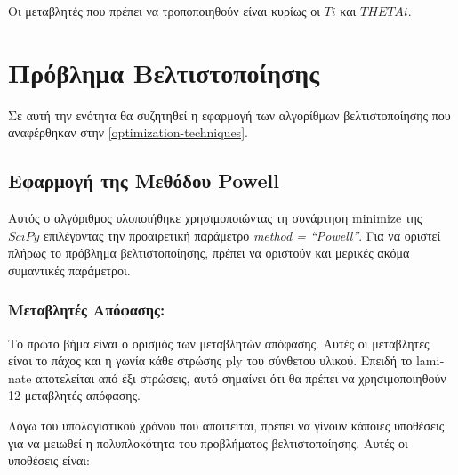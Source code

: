 Οι μεταβλητές που πρέπει να τροποποιηθούν είναι κυρίως οι $Ti$ και $THETAi$.

\section{Πρόβλημα Βελτιστοποίησης}\label{optimization-problem}

Σε αυτή την ενότητα θα συζητηθεί η εφαρμογή των αλγορίθμων βελτιστοποίησης που αναφέρθηκαν στην \autoref{optimization-techniques}.

\subsection{Εφαρμογή της Μεθόδου \textlatin{Powell}}
\label{applying-powells-method}

Αυτός ο αλγόριθμος υλοποιήθηκε χρησιμοποιώντας τη συνάρτηση \textlatin{minimize} της $SciPy$ \cite{2020SciPy-NMeth} επιλέγοντας την προαιρετική παράμετρο \textlatin{\emph{method = ``Powell''}}.
Για να οριστεί πλήρως το πρόβλημα βελτιστοποίησης, πρέπει να οριστούν και μερικές ακόμα συμαντικές παράμετροι.

\subsubsection{Μεταβλητές Απόφασης:}

Το πρώτο βήμα είναι ο ορισμός των μεταβλητών απόφασης. Αυτές οι μεταβλητές είναι το πάχος και η γωνία κάθε στρώσης \textlatin{ply} του σύνθετου υλικού. Επειδή το \textlatin{laminate} αποτελείται από έξι στρώσεις, αυτό σημαίνει ότι θα πρέπει να χρησιμοποιηθούν 12 μεταβλητές απόφασης.

Λόγω του υπολογιστικού χρόνου που απαιτείται, πρέπει να γίνουν κάποιες υποθέσεις για να μειωθεί η πολυπλοκότητα του προβλήματος βελτιστοποίησης. Αυτές οι υποθέσεις είναι:


